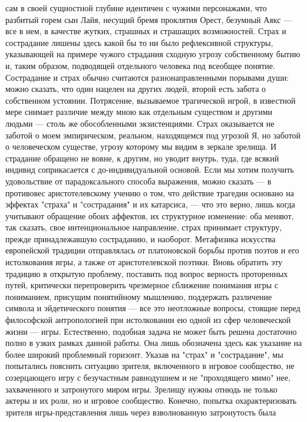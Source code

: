 \documentclass[12pt]{article}
\begin{document}
сам в своей сущностной глубине идентичен с чужими персонажами, что разбитый горем сын Лайя, несущий
бремя проклятия Орест, безумный Аякс --- все в нем, в качестве жутких, страшных и страшащих возможностей.
Страх и сострадание лишены здесь какой бы то ни было рефлексивной структуры, указывающей на примере
чужого страдания сходную угрозу собственному бытию и, таким образом, подводящей отдельного человека под
всеобщее понятие. Сострадание и страх обычно считаются
разнонаправленными порывами души: можно сказать, что один нацелен на других людей, второй есть забота о
собственном устоянии. Потрясение, вызываемое трагической игрой, в известной мере снимает различие между
мною  как  отдельным  существом  и  другими  людьми  ---  столь  же  обособленными  экзистенциями.  Страх
оказывается  не  заботой  о  моем  эмпирическом,  реальном,  находящемся  под  угрозой  Я,  но  заботой  о
человеческом существе, угрозу которому мы видим в зеркале зрелища. И страдание обращено не вовне, к
другим, но уводит внутрь, туда, где всякий индивид соприкасается с до-индивидуальной основой. Если мы
хотим  получить  удовольствие  от  парадоксального  способа  выражения,  можно  сказать  ---  в  противовес
аристотелевскому учению о том, что действие трагедии основано на эффектах "страха" и "сострадания" и их
катарсиса, --- что это верно, лишь когда учитывают обращение обоих аффектов, их структурное изменение: оба
меняют, так сказать, свое интенциональное направление, страх принимает структуру, прежде принадлежавшую
состраданию, и наоборот. Метафизика искусства европейской традиции отправлялась от платоновской борьбы 
против поэтов и его истолкования игры, а также от аристотелевской поэтики. Вновь обратить эту традицию в
открытую проблему, поставить под вопрос верность проторенных путей, критически перепроверить чрезмерное
сближение  понимания  игры  с  пониманием,  присущим  понятийному  мышлению,  поддержать  различение
символа и эйдетического понятия --- все это неотложные вопросы, стоящие перед философской антропологией
при истолковании ею одной из сфер человеческой жизни --- игры. Естественно, подобная задача не может быть
решена достаточно полно в узких рамках данной работы. Она лишь обозначена здесь как указание на более
широкий проблемный горизонт.
Указав  на  "страх"  и  "сострадание",  мы  попытались  пояснить  ситуацию  зрителя,  включенного  в  игровое
сообщество, не созерцающего игру с безучастным равнодушием и не "проходящего мимо" нее, захваченного и
затронутого миром игры. Зрелищу нужны отнюдь не только актеры и их роли, но и игровое сообщество.
Конечно, попытка охарактеризовать зрителя игры-представления лишь через взволнованную затронутость была
\end{document}
